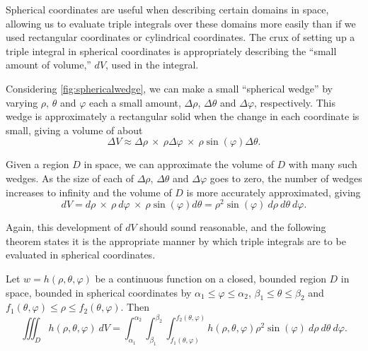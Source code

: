 Spherical coordinates are useful when describing certain domains in space, allowing us to evaluate triple integrals over these domains more easily than if we used rectangular coordinates or cylindrical coordinates. The crux of setting up a triple integral in spherical coordinates is appropriately describing the ``small amount of volume,'' $dV$, used in the integral.

Considering \autoref{fig:sphericalwedge}, we can make a small ``spherical wedge'' by varying $\rho$, $\theta$ and $\varphi$ each a small amount, $\Delta\rho$, $\Delta\theta$ and $\Delta\varphi$, respectively. This wedge is approximately a rectangular solid when the change in each coordinate is small, giving a volume of about
\[
\Delta V \approx \Delta\rho\ \times\ \rho\Delta\varphi\ \times\ \rho\sin(\varphi)\Delta\theta.
\]


Given a region $D$ in space, we can approximate the volume of $D$ with many such wedges. As the size of each of $\Delta\rho$, $\Delta\theta$ and $\Delta\varphi$ goes to zero, the number of wedges increases to infinity and the volume of $D$ is more accurately approximated, giving
\[
dV = d\rho\ \times\ \rho\ d\varphi\ \times\ \rho\sin(\varphi)d\theta = \rho^2\sin(\varphi)\ d\rho\ d\theta\ d\varphi.
\]

Again, this development of $dV$ should sound reasonable, and the following theorem states it is the appropriate manner by which triple integrals are to be evaluated in spherical coordinates.


{Let $w=h(\rho,\theta,\varphi)$ be a continuous function on a closed, bounded region $D$ in space, bounded in spherical coordinates by $\alpha_1 \leq \varphi \leq \alpha_2$, $\beta_1 \leq \theta \leq \beta_2$ and $f_1(\theta,\varphi) \leq \rho \leq f_2(\theta,\varphi)$. Then 
\[
\iiint_D h(\rho,\theta,\varphi)\ dV = \int_{\alpha_1}^{\alpha_2}\int_{\beta_1}^{\beta_2}\int_{f_1(\theta,\varphi)}^{f_2(\theta,\varphi)} h(\rho,\theta,\varphi) \rho^2\sin(\varphi)\ d\rho\ d\theta\ d\varphi.
\]}

